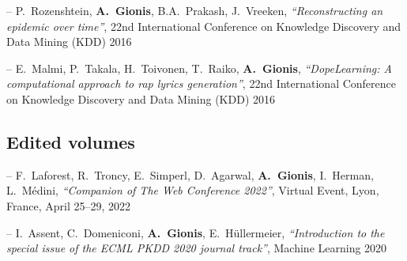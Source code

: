 \documentclass[a4paper,11pt]{article}
\begin{document}
\item[--] 
{P.\ Rozenshtein, \textbf{A.\ Gionis}, B.A.\ Prakash, J.\ Vreeken},
{\em ``Reconstructing an epidemic over time''}, 
22nd International Conference on Knowledge Discovery and Data Mining (KDD) 2016

\item[--] 
{E.\ Malmi, P.\ Takala, H.\ Toivonen, T.\ Raiko, \textbf{A.\ Gionis}}, 
{\em ``DopeLearning: A computational approach to rap lyrics generation''}, 
22nd International Conference on Knowledge Discovery and Data Mining (KDD) 2016



\biblistend

	
\subsection{{Edited volumes}}

\biblist

\item[--]
{F.\ Laforest, R.\ Troncy, E.\ Simperl, D.\ Agarwal, \textbf{A.\ Gionis}, I.\ Herman, L.\ Médini},
{\em ``Companion of The Web Conference 2022''}, 
Virtual Event, Lyon, France, April 25--29, 2022

\item[--]
{I.\ Assent, C.\ Domeniconi, \textbf{A.\ Gionis}, E.\ Hüllermeier},
{\em ``Introduction to the special issue of the ECML PKDD 2020 journal track''},
Machine Learning 2020

\biblistend
\end{document}
